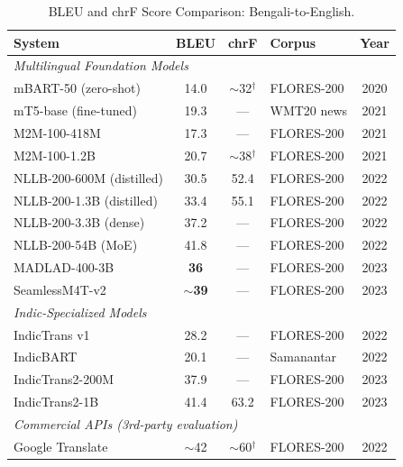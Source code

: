 \documentclass[conference]{IEEEtran}
\begin{document}
\begin{table}[t]
  \centering
  \caption{BLEU and chrF Score Comparison: Bengali-to-English.}
  \label{tab:bleu}
  \small
  \setlength{\tabcolsep}{3pt}
  \begin{tabular}{p{3.4cm} c c p{1.7cm} c}
    \toprule
    \textbf{System} & \textbf{BLEU} & \textbf{chrF} & \textbf{Corpus} & \textbf{Year} \\
    \midrule
    \multicolumn{5}{l}{\textit{Multilingual Foundation Models}} \\
    mBART-50 (zero-shot)         & 14.0  & $\sim$32$^\dagger$ & FLORES-200  & 2020 \\
    mT5-base (fine-tuned)        & 19.3  & ---                & WMT20 news  & 2021 \\
    M2M-100-418M                 & 17.3  & ---                & FLORES-200  & 2021 \\
    M2M-100-1.2B                 & 20.7  & $\sim$38$^\dagger$ & FLORES-200  & 2021 \\
    NLLB-200-600M (distilled)    & 30.5  & 52.4               & FLORES-200  & 2022 \\
    NLLB-200-1.3B (distilled)    & 33.4  & 55.1               & FLORES-200  & 2022 \\
    NLLB-200-3.3B (dense)        & 37.2  & ---                & FLORES-200  & 2022 \\
    NLLB-200-54B (MoE)           & 41.8  & ---                & FLORES-200  & 2022 \\
    MADLAD-400-3B~\cite{kudugunta2023madlad} & \textbf{36} & --- & FLORES-200 & 2023 \\
    SeamlessM4T-v2~\cite{seamlessm4t2023}    & $\sim$\textbf{39} & --- & FLORES-200 & 2023 \\
    \midrule
    \multicolumn{5}{l}{\textit{Indic-Specialized Models}} \\
    IndicTrans v1                & 28.2  & ---                & FLORES-200  & 2022 \\
    IndicBART                    & 20.1  & ---                & Samanantar  & 2022 \\
    IndicTrans2-200M             & 37.9  & ---                & FLORES-200  & 2023 \\
    IndicTrans2-1B               & 41.4  & 63.2               & FLORES-200  & 2023 \\
    \midrule
    \multicolumn{5}{l}{\textit{Commercial APIs (3rd-party evaluation)}} \\
    Google Translate             & $\sim$42 & $\sim$60$^\dagger$ & FLORES-200  & 2022 \\

\end{tabular}
\end{table}
\end{document}
